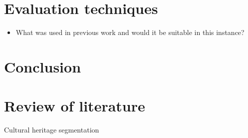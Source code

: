 
\section{Evaluation techniques}
\begin{itemize}
	\item What was used in previous work and would it be suitable in this instance?
\end{itemize}
	
		

\section{Conclusion}



\section{Review of literature}

\cite{Spina2010} Cultural heritage segmentation

